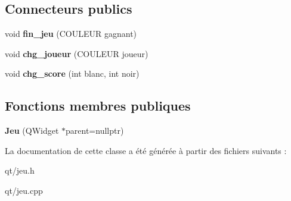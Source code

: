 \subsection*{Connecteurs publics}
\begin{DoxyCompactItemize}
\item 
void {\bfseries fin\+\_\+jeu} (C\+O\+U\+L\+E\+UR gagnant)\hypertarget{classJeu_a3d7d1dc21c8a3336440c9af7c289452a}{}\label{classJeu_a3d7d1dc21c8a3336440c9af7c289452a}

\item 
void {\bfseries chg\+\_\+joueur} (C\+O\+U\+L\+E\+UR joueur)\hypertarget{classJeu_ad51b6ae5dca6dab2a092da240a8820ff}{}\label{classJeu_ad51b6ae5dca6dab2a092da240a8820ff}

\item 
void {\bfseries chg\+\_\+score} (int blanc, int noir)\hypertarget{classJeu_a3509e6e8e27c48765ae5a473d4f96634}{}\label{classJeu_a3509e6e8e27c48765ae5a473d4f96634}

\end{DoxyCompactItemize}
\subsection*{Fonctions membres publiques}
\begin{DoxyCompactItemize}
\item 
{\bfseries Jeu} (Q\+Widget $\ast$parent=nullptr)\hypertarget{classJeu_a246784c6dc72e495a15a202b32b40448}{}\label{classJeu_a246784c6dc72e495a15a202b32b40448}

\end{DoxyCompactItemize}


La documentation de cette classe a été générée à partir des fichiers suivants \+:\begin{DoxyCompactItemize}
\item 
qt/jeu.\+h\item 
qt/jeu.\+cpp\end{DoxyCompactItemize}
